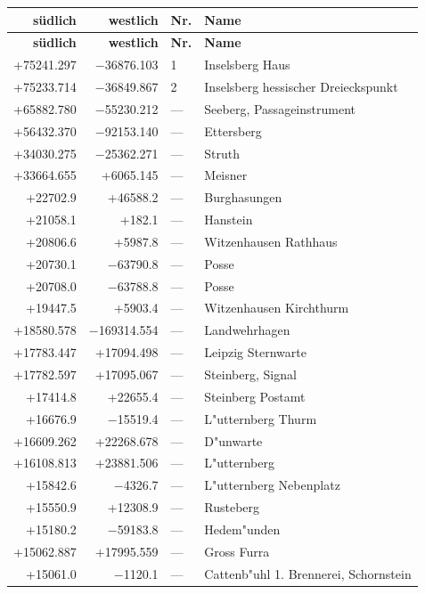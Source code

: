 \documentclass[12pt,a4paper]{article}
\begin{document}
\vspace{1em}

\small

\begin{longtable}{r r l p{6cm}}
\toprule
\textbf{s\"udlich} & \textbf{westlich} & \textbf{Nr.} & \textbf{Name} \\
\midrule
\endfirsthead
\toprule
\textbf{s\"udlich} & \textbf{westlich} & \textbf{Nr.} & \textbf{Name} \\
\midrule
\endhead
\bottomrule
\endfoot
+75241.297 & $-$36876.103 & 1 & Inselsberg Haus \\
+75233.714 & $-$36849.867 & 2 & Inselsberg hessischer Dreieckspunkt \\
+65882.780 & $-$55230.212 & --- & Seeberg, Passageinstrument \\
+56432.370 & $-$92153.140 & --- & Ettersberg \\
+34030.275 & $-$25362.271 & --- & Struth \\
+33664.655 & +6065.145 & --- & Meisner \\
+22702.9 & +46588.2 & --- & Burghasungen \\
+21058.1 & +182.1 & --- & Hanstein \\
+20806.6 & +5987.8 & --- & Witzenhausen Rathhaus \\
+20730.1 & $-$63790.8 & --- & Posse \\
+20708.0 & $-$63788.8 & --- & Posse \\
+19447.5 & +5903.4 & --- & Witzenhausen Kirchthurm \\
+18580.578 & $-$169314.554 & --- & Landwehrhagen \\
+17783.447 & +17094.498 & --- & Leipzig Sternwarte \\
+17782.597 & +17095.067 & --- & Steinberg, Signal \\
+17414.8 & +22655.4 & --- & Steinberg Postamt \\
+16676.9 & $-$15519.4 & --- & L{"u}tternberg Thurm \\
+16609.262 & +22268.678 & --- & D{"u}nwarte \\
+16108.813 & +23881.506 & --- & L{"u}tternberg \\
+15842.6 & $-$4326.7 & --- & L{"u}tternberg Nebenplatz \\
+15550.9 & +12308.9 & --- & Rusteberg \\
+15180.2 & $-$59183.8 & --- & Hedem{"u}nden \\
+15062.887 & +17995.559 & --- & Gross Furra \\
+15061.0 & $-$1120.1 & --- & Cattenb{"u}hl 1. Brennerei, Schornstein \\

\end{longtable}
\end{document}
